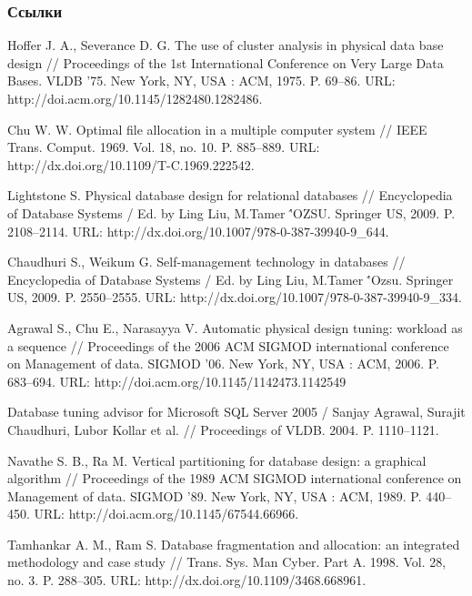 \documentclass[unicode]{beamer}
\begin{document}
\begin{frame}[allowframebreaks]
\frametitle{Ссылки}
\footnotesize{
\begin{thebibliography}{99} %

 Hoffer J. A., Severance D. G. The use of cluster analysis in physical data base design // Proceedings of the 1st International Conference on Very
Large Data Bases. VLDB ’75. New York, NY, USA : ACM, 1975. P. 69--86.
URL: http://doi.acm.org/10.1145/1282480.1282486.

 Chu W. W.  Optimal file allocation in a multiple computer system // IEEE Trans. Comput. 1969. Vol. 18, no. 10. P. 885--889. URL: http://dx.doi.org/10.1109/T-C.1969.222542.

 Lightstone S. Physical database design for relational databases // Encyclopedia of Database Systems / Ed. by Ling Liu, M.Tamer \''{O}ZSU. Springer US, 2009. P. 2108--2114. URL: http://dx.doi.org/10.1007/978-0-387-39940-9\_644.

 Chaudhuri S., Weikum G. Self-management technology in databases // Encyclopedia of Database Systems / Ed. by Ling Liu, M.Tamer \''{O}zsu.
Springer US, 2009. P. 2550--2555. URL: http://dx.doi.org/10.1007/978-0-387-39940-9\_334.

 Agrawal S., Chu E., Narasayya V. Automatic physical design tuning: workload as a sequence // Proceedings of the 2006 ACM SIGMOD international conference on Management of data. SIGMOD ’06. New York, NY, USA : ACM, 2006. P. 683--694. URL: http://doi.acm.org/10.1145/1142473.1142549

 Database tuning advisor for Microsoft SQL Server 2005 / Sanjay Agrawal, Surajit Chaudhuri, Lubor Kollar et al. // Proceedings of VLDB. 2004. P. 1110--1121.

 Navathe S. B., Ra M. Vertical partitioning for database design: a graphical algorithm // Proceedings of the 1989 ACM SIGMOD international conference on Management of data. SIGMOD ’89. New York, NY, USA : ACM, 1989. P. 440--450. URL: http://doi.acm.org/10.1145/67544.66966.

 Tamhankar A. M., Ram S. Database fragmentation and allocation: an integrated methodology and case study // Trans. Sys. Man Cyber. Part A. 1998. Vol. 28, no. 3. P. 288--305. URL: http://dx.doi.org/10.1109/3468.668961.


\end{thebibliography}}
\end{frame}
\end{document}
